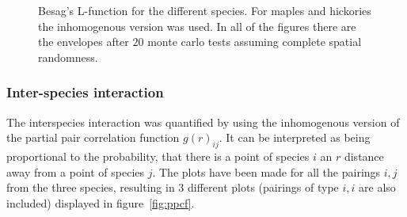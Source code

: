 \documentclass[12pt,a4paper,oneside,article]{memoir}
\begin{document}
\begin{figure}[htb]
\begin{adjustwidth}{-2in}{-2in}
  \end{adjustwidth}
  \caption{Besag's L-function for the different species. For maples and hickories the inhomogenous version was used. In all of the
  figures there are the envelopes after $20$ monte carlo tests assuming complete spatial randomness.}
  \label{fig:intra_interactions}
\end{figure}


\subsubsection{Inter-species interaction}

The interspecies interaction was quantified by using 
the inhomogenous version of the partial pair correlation function $g(r)_{ij}$. 
It can be interpreted as being proportional to the probability, 
that there is a point of species $i$ an $r$ distance away from a point of species $j$. 
The plots have been made for all the pairings $i,j$ from the three species, resulting
in $3$ different plots (pairings of type $i,i$ are also included) displayed in figure~\ref{fig:ppcf}.
\end{document}
